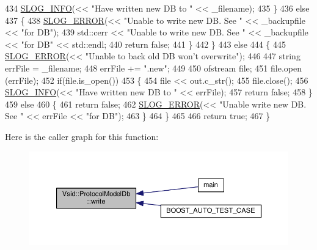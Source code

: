 \begin{DoxyCode}
434             \hyperlink{_logger_8h_a119c1c29ba35a8db38e2358e41167282}{SLOG\_INFO}(<< \textcolor{stringliteral}{"Have written new DB to "} << \_filename);
435         \}
436         \textcolor{keywordflow}{else}
437         \{
438             \hyperlink{_logger_8h_a2a8694cd392d18f4db6b9cc9f15bafe3}{SLOG\_ERROR}(<< \textcolor{stringliteral}{"Unable to write new DB. See "} << \_backupfile << \textcolor{stringliteral}{"for DB"});
439             std::cerr << \textcolor{stringliteral}{"Unable to write new DB. See "} << \_backupfile << \textcolor{stringliteral}{"for DB"} << std::endl;
440             \textcolor{keywordflow}{return} \textcolor{keyword}{false};
441         \}
442     \}
443     \textcolor{keywordflow}{else}
444     \{
445         \hyperlink{_logger_8h_a2a8694cd392d18f4db6b9cc9f15bafe3}{SLOG\_ERROR}(<< \textcolor{stringliteral}{"Unable to back old DB won't overwrite"});
446 
447         \textcolor{keywordtype}{string} errFile = \_filename;
448         errFile += \textcolor{stringliteral}{".new"};
449 
450         ofstream file;
451         file.open (errFile);
452         \textcolor{keywordflow}{if}(file.is\_open())
453         \{
454             file << out.c\_str();
455             file.close();
456             \hyperlink{_logger_8h_a119c1c29ba35a8db38e2358e41167282}{SLOG\_INFO}(<< \textcolor{stringliteral}{"Have written new DB to "} << errFile);
457             \textcolor{keywordflow}{return} \textcolor{keyword}{false};
458         \}
459         \textcolor{keywordflow}{else}
460         \{
461             \textcolor{keywordflow}{return} \textcolor{keyword}{false};
462             \hyperlink{_logger_8h_a2a8694cd392d18f4db6b9cc9f15bafe3}{SLOG\_ERROR}(<< \textcolor{stringliteral}{"Unable write new DB. See "} << errFile << \textcolor{stringliteral}{"for DB"});
463         \}
464     \}
465 
466     \textcolor{keywordflow}{return} \textcolor{keyword}{true};
467 \}
\end{DoxyCode}


Here is the caller graph for this function\-:
\nopagebreak
\begin{figure}[H]
\begin{center}
\leavevmode
\includegraphics[width=350pt]{class_vsid_1_1_protocol_model_db_a6555ccdf11081b5e255ee3b8d17a7ea8_icgraph}
\end{center}
\end{figure}




